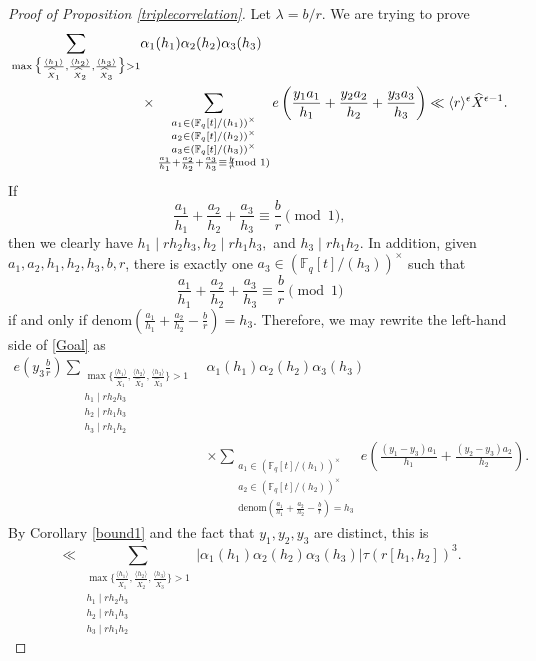 \documentclass{article}
\theoremstyle{definition}
\theoremstyle{definition}
\theoremstyle{remark}
\newcommand{\F}{\mathbb{F}_q[t]}
\newcommand{\1}{\mathbf{1}}
\numberwithin{equation}{section}
\begin{document}
\begin{proof}[Proof of Proposition \ref{triplecorrelation}]
Let $\lambda=b\slash r$. We are trying to prove 
\begin{align}
\sum_{\max\big\{\frac{\langle h_1\rangle }{\widehat{X}_1},\frac{\langle h_2\rangle }{\widehat{X}_2},\frac{\langle h_3\rangle }{\widehat{X}_3}\big\}>1}&\alpha_1(h_1)\alpha_2(h_2)\alpha_3(h_3)\notag\\
&\times\sum_{\substack{a_1\in (\F/(h_1))^\times\\a_2\in (\F/(h_2))^\times\\a_3\in (\F/(h_3))^\times\\\frac{a_1}{h_1}+\frac{a_2}{h_2}+\frac{a_3}{h_3}\equiv\frac{b}{r}\hspace*{-2.5mm}\pmod{1}}}e\left(\frac{y_1a_1}{h_1}+\frac{y_2a_2}{h_2}+\frac{y_3a_3}{h_3}\right)\ll \langle r\rangle^{\epsilon}\widehat{X}^{\epsilon-1}\label{Goal}.
\end{align}
If 
\[\frac{a_1}{h_1}+\frac{a_2}{h_2}+\frac{a_3}{h_3}\equiv\frac{b}{r}\pmod{1},\]
then we clearly have $h_1\mid rh_2h_3, h_2\mid rh_1h_3,$ and $h_3\mid rh_1h_2$. In addition, given $a_1,a_2,h_1,h_2,h_3,b,r$, there is exactly one $a_3\in (\F/(h_3))^\times$ such that 
\[\frac{a_1}{h_1}+\frac{a_2}{h_2}+\frac{a_3}{h_3}\equiv\frac{b}{r}\pmod{1}\]
if and only if $\text{denom}(\frac{a_1}{h_1}+\frac{a_2}{h_2}-\frac{b}{r})=h_3$.
Therefore, we may rewrite the left-hand side of \eqref{Goal} as 
\begin{align*}
e\left(y_3\frac{b}{r}\right)\sum_{\substack{\max\big\{\frac{\langle h_1\rangle }{\widehat{X}_1},\frac{\langle h_2\rangle }{\widehat{X}_2},\frac{\langle h_3\rangle }{\widehat{X}_3}\big\}>1\\h_1\mid rh_2h_3\\ h_2\mid rh_1h_3\\h_3\mid rh_1h_2}}&\alpha_1(h_1)\alpha_2(h_2)\alpha_3(h_3)\\
&\times\sum_{\substack{a_1\in (\F/(h_1))^\times\\a_2\in (\F/(h_2))^\times\\\text{denom}(\frac{a_1}{h_1}+\frac{a_2}{h_2}-\frac{b}{r})=h_3}}e\left(\frac{(y_1-y_3)a_1}{h_1}+\frac{(y_2-y_3)a_2}{h_2}\right).
\end{align*}
By Corollary \ref{bound1} and the fact that $y_1,y_2,y_3$ are distinct, this is 
\[\ll\sum_{\substack{\max\big\{\frac{\langle h_1\rangle }{\widehat{X}_1},\frac{\langle h_2\rangle }{\widehat{X}_2},\frac{\langle h_3\rangle }{\widehat{X}_3}\big\}>1\\h_1\mid rh_2h_3\\ h_2\mid rh_1h_3\\h_3\mid rh_1h_2}}|\alpha_1(h_1)\alpha_2(h_2)\alpha_3(h_3)|\tau(r[h_1,h_2])^3.\]

\end{proof}
\end{document}
